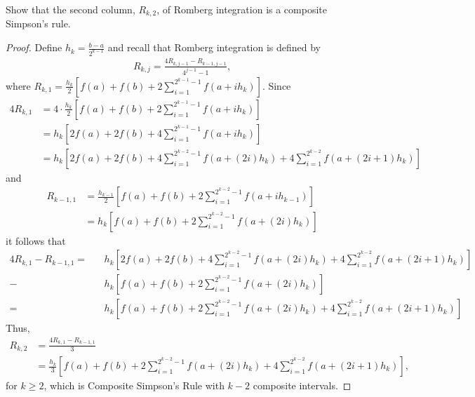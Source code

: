 \documentclass[8pt]{article}
\theoremstyle{definition}
\newenvironment{exercise}[1]
  {\renewcommand\theinnerexercise{#1}\innerexercise}
  {\endinnerexercise}
\begin{document}
\begin{exercise}{2}
Show that the second column, $R_{k, 2}$, of Romberg integration is a composite Simpson's rule.
\end{exercise}

\begin{proof}
Define $h_k = \frac{b-a}{2^{k-1}}$ and recall that Romberg integration is defined by 
\begin{align*}
R_{k,j} = \frac{4 R_{k, j-1} - R_{k-1, j-1}}{4^{j-1} - 1},
\end{align*}
where $R_{k,1} = \frac{h_k}{2} \left[ f(a) + f(b) + 2 \sum_{i = 1}^{2^{k-1} - 1} f (a + i h_k ) \right]$. Since 
\begin{align*}
4 R_{k,1} &= 4 \cdot \frac{h_k}{2} \left[ f(a) + f(b) + 2 \sum_{i = 1}^{2^{k-1} - 1} f (a + i h_k ) \right] \\
&= h_{k} \left[ 2 f(a) + 2 f(b) + 4 \sum_{i = 1}^{2^{k-1} - 1} f (a + i h_k ) \right] \\
&= h_{k} \left[ 2 f(a) + 2 f(b) + 4 \sum_{i = 1}^{2^{k-2} - 1} f (a + (2i) h_k ) + 4 \sum_{i = 1}^{2^{k-2}} f (a + (2i + 1) h_k ) \right]
\end{align*}
and
\begin{align*}
R_{k-1,1} &= \frac{h_{k-1}}{2} \left[ f(a) + f(b) + 2 \sum_{i = 1}^{2^{k-2} - 1} f (a + i h_{k-1} ) \right] \\
&= h_{k} \left[ f(a) + f(b) + 2 \sum_{i = 1}^{2^{k-2} - 1} f (a + (2i) h_k ) \right] 
\end{align*}
it follows that
\begin{align*}
4 R_{k,1} - R_{k-1,1} = \ \ \ \ &h_{k} \left[ 2 f(a) + 2 f(b) + 4 \sum_{i = 1}^{2^{k-2} - 1} f (a + (2i) h_k ) + 4 \sum_{i = 1}^{2^{k-2}} f (a + (2i + 1) h_k ) \right] \\
- &h_{k} \left[ f(a) + f(b) + 2 \sum_{i = 1}^{2^{k-2} - 1} f (a + (2i) h_k ) \right] \\
= \ \ \ \ &h_{k} \left[ f(a) + f(b) + 2 \sum_{i = 1}^{2^{k-2} - 1} f (a + (2i) h_k ) + 4 \sum_{i = 1}^{2^{k-2}} f (a + (2i + 1) h_k ) \right]
\end{align*}
Thus,
\begin{align*}
R_{k,2} &= \frac{4 R_{k, 1} - R_{k-1, 1}}{3} \\
&= \frac{h_{k}}{3} \left[ f(a) + f(b) + 2 \sum_{i = 1}^{2^{k-2} - 1} f (a + (2i) h_k ) + 4 \sum_{i = 1}^{2^{k-2}} f (a + (2i + 1) h_k ) \right],
\end{align*}
for $k \geq 2$, which is Composite Simpson's Rule with $k - 2$ composite intervals.
\end{proof}
\newpage
\end{document}

